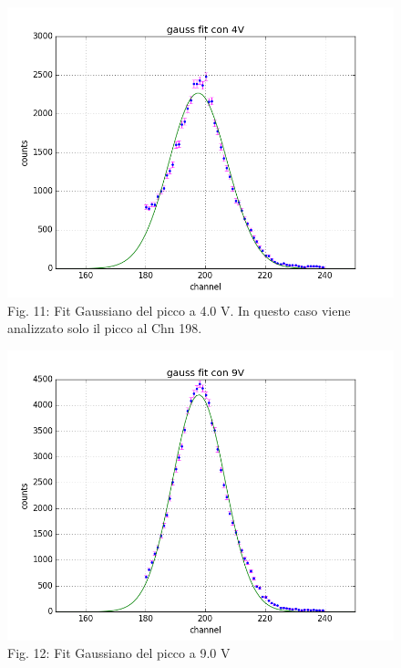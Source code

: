 \documentclass[a4paper]{article}
\begin{document}
\begin{figure}[H]
\includegraphics[width=1\textwidth]{Fit_Gaussiano_con_4V}
        \caption{Fig. 11: Fit Gaussiano del picco a 4.0 V. In questo caso viene analizzato solo il picco al Chn 198.}
        \label{fig:11}
  \end{figure}
  
  \begin{figure}[H]
  
  
\includegraphics[width=1\textwidth]{Fit_Gaussiano_con_9V}
        \caption{Fig. 12: Fit Gaussiano del picco a 9.0 V}
        \label{fig:12}
\end{figure}
\end{document}
